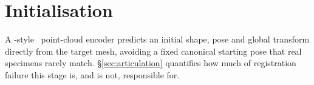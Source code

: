 \section{Initialisation}
\label{sec:init-stage}

A -style~\cite{pointnet} point-cloud encoder predicts an
initial shape, pose and global transform directly from the target mesh,
avoiding a fixed canonical starting pose that real specimens rarely match.
\S\ref{sec:articulation} quantifies how much of registration failure this
stage is, and is not, responsible for.
